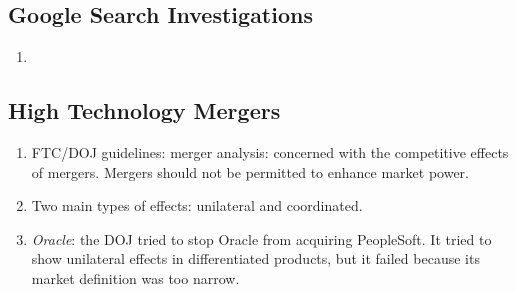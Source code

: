 \subsection{Google Search Investigations} %

\begin{enumerate}
    \item 
\end{enumerate}

\subsection{High Technology Mergers} %

\begin{enumerate}
    \item FTC/DOJ guidelines: merger analysis: concerned with the competitive 
    effects of mergers. Mergers should not be permitted to enhance market 
    power.
    \item Two main types of effects: unilateral and coordinated.
    \item \emph{Oracle}: the DOJ tried to stop Oracle from acquiring 
    PeopleSoft. It tried to show unilateral effects in differentiated 
    products, but it failed because its market definition was too narrow.
\end{enumerate}
